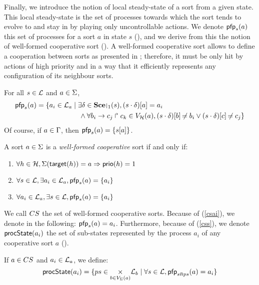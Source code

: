 Finally, we introduce the notion of local steady-state of a sort from a given state.
This local steady-state is the set of processes towards which the sort tends to evolve to and stay in by playing only uncontrollable actions.
We denote $\mathsf{pfp}_s(a)$ this set of processes for a sort $a$ in state $s$ (),
and we derive from this the notion of well-formed cooperative sort ().
A well-formed cooperative sort allows to define a cooperation between sorts as presented in ;
therefore, it must be only hit by actions of high priority
and in a way that it efficiently represents any configuration of its neighbour sorts.
\begin{definition}[$\pfp : \PHl \times \PHs \rightarrow \powerset(\PHproc)$]
\label{def:pfp}
  For all $s \in \mathcal{L}$ and $a \in \Sigma$,
  \begin{align*}
    \pfp_s(a) = \{ a_i \in \PHl_a &\mid \exists \delta \in \restriction{\Sce}{1}(s), \PHget{(s \PHplay \delta)}{a} = a_i \\
    & \quad \wedge \forall \PHhit{b_i}{c_j}{c_k} \in \Vh(a), \PHget{(s \PHplay \delta)}{b} \neq b_i \vee \PHget{(s \PHplay \delta)}{c} \neq c_j \}
  \end{align*}
  Of course, if $a \in \Gamma$, then $\mathsf{pfp}_s(a) = \{ {s[a]} \}$.
\end{definition}
%
\begin{definition}
\label{def:cs}
  A sort $a \in \Sigma$ is a \emph{well-formed cooperative} sort if and only if:
  \begin{enumerate}
    \item $\forall h \in \mathcal{H}, \Sigma(\mathsf{target}(h)) = a \Rightarrow \mathsf{prio}(h) = 1$
    \item \label{csai} $\forall s \in \mathcal{L}, \exists a_i \in \mathcal{L}_a, \mathsf{pfp}_s(a) = \{ a_i \}$
    \item \label{css} $\forall a_i \in \mathcal{L}_a, \exists s \in \mathcal{L}, \mathsf{pfp}_s(a) = \{ a_i \}$
  \end{enumerate}
\end{definition}
We call $CS$ the set of well-formed cooperative sorts.
Because of (\ref{csai}), we denote in the following: $\mathsf{pfp}_s(a) = a_i$.
Furthermore, because of (\ref{css}), we denote $\mathsf{procState}(a_i)$ the set of sub-states represented by the process $a_i$ of any cooperative sort $a$ ().
\begin{definition}[$\csState : \PHproc \rightarrow \powerset(\PHproc)$]
\label{def:csState}
  If $a \in CS$ and $a_i \in \mathcal{L}_a$, we define:
  $$\mathsf{procState}(a_i) = \{ ps \in \underset{b \in V_\Sigma(a)}{\times} \mathcal{L}_b \mid \forall s \in \mathcal{L}, \mathsf{pfp}_{s \Cap ps}(a) = a_i \}$$
\end{definition}

